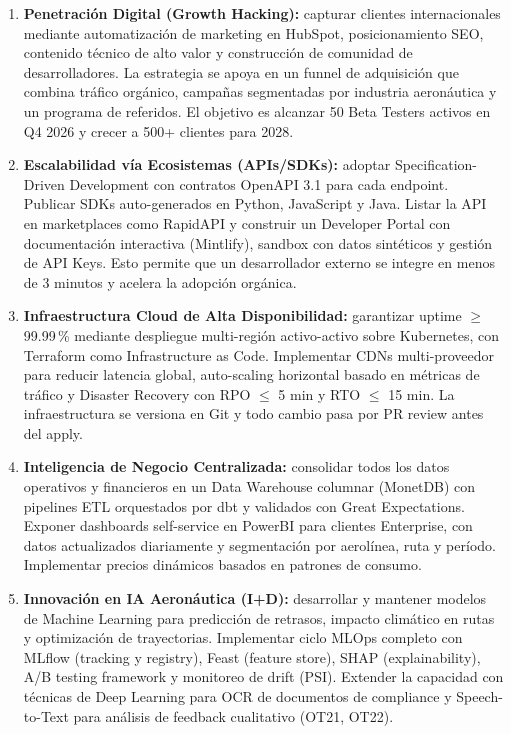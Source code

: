 ﻿\documentclass[11pt, letterpaper]{article}
\begin{document}
\begin{enumerate}[leftmargin=1.5cm, label=\textbf{OE\arabic*}, itemsep=2pt, topsep=4pt]

    \item \textbf{Penetración Digital (Growth Hacking):} capturar clientes internacionales mediante automatización de marketing en HubSpot, posicionamiento SEO, contenido técnico de alto valor y construcción de comunidad de desarrolladores. La estrategia se apoya en un funnel de adquisición que combina tráfico orgánico, campañas segmentadas por industria aeronáutica y un programa de referidos. El objetivo es alcanzar 50 Beta Testers activos en Q4 2026 y crecer a 500+ clientes para 2028.



    \item \textbf{Escalabilidad vía Ecosistemas (APIs/SDKs):} adoptar Specification-Driven Development con contratos OpenAPI 3.1 para cada endpoint. Publicar SDKs auto-generados en Python, JavaScript y Java. Listar la API en marketplaces como RapidAPI y construir un Developer Portal con documentación interactiva (Mintlify), sandbox con datos sintéticos y gestión de API Keys. Esto permite que un desarrollador externo se integre en menos de 3 minutos y acelera la adopción orgánica.



    \item \textbf{Infraestructura Cloud de Alta Disponibilidad:} garantizar uptime $\geq$ 99.99\,\% mediante despliegue multi-región activo-activo sobre Kubernetes, con Terraform como Infrastructure as Code. Implementar CDNs multi-proveedor para reducir latencia global, auto-scaling horizontal basado en métricas de tráfico y Disaster Recovery con RPO $\leq$ 5 min y RTO $\leq$ 15 min. La infraestructura se versiona en Git y todo cambio pasa por PR review antes del apply.



    \item \textbf{Inteligencia de Negocio Centralizada:} consolidar todos los datos operativos y financieros en un Data Warehouse columnar (MonetDB) con pipelines ETL orquestados por dbt y validados con Great Expectations. Exponer dashboards self-service en PowerBI para clientes Enterprise, con datos actualizados diariamente y segmentación por aerolínea, ruta y período. Implementar precios dinámicos basados en patrones de consumo.



    \item \textbf{Innovación en IA Aeronáutica (I+D):} desarrollar y mantener modelos de Machine Learning para predicción de retrasos, impacto climático en rutas y optimización de trayectorias. Implementar ciclo MLOps completo con MLflow (tracking y registry), Feast (feature store), SHAP (explainability), A/B testing framework y monitoreo de drift (PSI). Extender la capacidad con técnicas de Deep Learning para OCR de documentos de compliance y Speech-to-Text para análisis de feedback cualitativo (OT21, OT22).




\end{enumerate}
\end{document}
